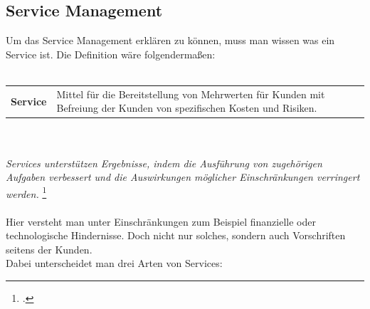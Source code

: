 {

\subsection{Service Management}
\label{chap: Service Management}

Um das Service Management erklären zu können, muss man wissen was ein Service ist.
Die Definition wäre folgendermaßen:
\\\\

\begin{tabular}{l|p{10cm}}
    \textbf{Service} & Mittel für die Bereitstellung von Mehrwerten für Kunden mit Befreiung der Kunden von spezifischen Kosten und Risiken.
\end{tabular}
\\ \\
\emph{Services unterstützen Ergebnisse, indem die Ausführung von zugehörigen Aufgaben verbessert und die Auswirkungen möglicher Einschränkungen verringert werden.}
\footcite[][Kap.\ 1.3, S.\ 6]{ITIL}
\\ \\
Hier versteht man unter Einschränkungen zum Beispiel finanzielle oder technologische Hindernisse.
Doch nicht nur solches, sondern auch Vorschriften seitens der Kunden. 
\\
Dabei unterscheidet man drei Arten von Services:

}
